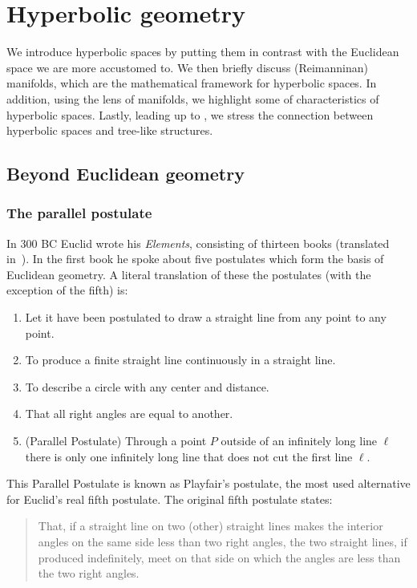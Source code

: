 \chapter{Hyperbolic geometry}\label{hyperbolic}
We introduce hyperbolic spaces by putting them in contrast with the Euclidean space we are more accustomed to. We then briefly discuss (Reimanninan) manifolds, which are the mathematical framework for hyperbolic spaces. In addition, using the lens of manifolds, we highlight some of characteristics of hyperbolic spaces. Lastly, leading up to , we stress the connection between hyperbolic spaces and tree-like structures.

\section{Beyond Euclidean geometry}

\subsection{The parallel postulate}\label{sec:parallelPostulate}
In 300 BC Euclid wrote his \textit{Elements}, consisting of thirteen books (translated in~\cite{Fitzpatrick2008euclidElementsGeometry}). In the first book he spoke about five postulates which form the basis of Euclidean geometry. A literal translation of these the postulates (with the exception of the fifth) is:
\begin{enumerate}
    \item Let it have been postulated to draw a straight line from any point to any point.
    \item To produce a finite straight line continuously in a straight line.
    \item To describe a circle with any center and distance.
    \item That all right angles are equal to another.
    \item (Parallel Postulate) Through a point $P$ outside of an infinitely long line $\ell$ there is only one infinitely long line that does not cut the first line $\ell$.
\end{enumerate}

This Parallel Postulate is known as Playfair’s postulate, the most used alternative for Euclid’s real fifth postulate. The original fifth postulate states:
\begin{quote}
    That, if a straight line on two (other) straight lines makes the interior angles on the same side less than two right angles, the two straight lines, if produced indefinitely, meet on that side on which the angles are less than the two right angles.
\end{quote}


